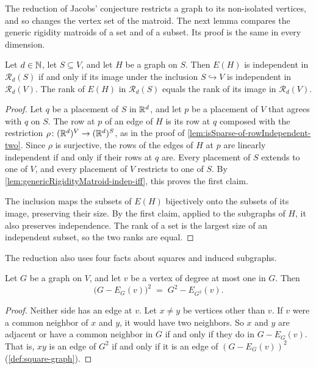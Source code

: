 The reduction of Jacobs' conjecture restricts a graph to its
non-isolated vertices, and so changes the vertex set of the matroid. The
next lemma compares the generic rigidity matroids of a set and of a
subset. Its proof is the same in every dimension.

\begin{lemma}
  \label{lem:genericMatroid-induce-transport}
  \leanok
  Let $d \in {\mathbb{N}}$, let $S \subseteq V$, and let $H$ be a graph on $S$.
  Then $E(H)$ is independent in $\mathcal{R}_d(S)$ if and only if its
  image under the inclusion $S \hookrightarrow V$ is independent in
  $\mathcal{R}_d(V)$. The rank of $E(H)$ in $\mathcal{R}_d(S)$ equals
  the rank of its image in $\mathcal{R}_d(V)$.
\end{lemma}
\begin{proof}
  \leanok
  Let $q$ be a placement of $S$ in ${\mathbb{R}}^d$, and let $p$ be a placement of
  $V$ that agrees with $q$ on $S$. The row at $p$ of an edge of $H$ is
  its row at $q$ composed with the restriction
  $\rho \colon ({\mathbb{R}}^d)^V \to ({\mathbb{R}}^d)^S$, as in the proof of
  \cref{lem:isSparse-of-rowIndependent-two}. Since $\rho$ is surjective,
  the rows of the edges of $H$ at $p$ are linearly independent if and
  only if their rows at $q$ are. Every placement of $S$ extends to one
  of $V$, and every placement of $V$ restricts to one of $S$. By
  \cref{lem:genericRigidityMatroid-indep-iff}, this proves the first
  claim.

  The inclusion maps the subsets of $E(H)$ bijectively onto the subsets
  of its image, preserving their size. By the first claim, applied to
  the subgraphs of $H$, it also preserves independence. The rank of a
  set is the largest size of an independent subset, so the two ranks
  are equal.
\end{proof}

The reduction also uses four facts about squares and induced subgraphs.

\begin{lemma}
  \label{lem:square-delete-degree-le-one}
  \leanok
  Let $G$ be a graph on $V$, and let $v$ be a vertex of degree at most
  one in $G$. Then
  \[
    \bigl(G - E_G(v)\bigr)^2 \;=\; G^2 - E_{G^2}(v).
  \]
\end{lemma}
\begin{proof}
  \leanok
  Neither side has an edge at $v$. Let $x \ne y$ be vertices other than
  $v$. If $v$ were a common neighbor of $x$ and $y$, it would have two
  neighbors. So $x$ and $y$ are adjacent or have a common neighbor in
  $G$ if and only if they do in $G - E_G(v)$. That is, $xy$ is an edge
  of $G^2$ if and only if it is an edge of $(G - E_G(v))^2$
  (\cref{def:square-graph}).
\end{proof}

